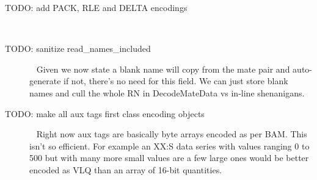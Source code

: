 \documentclass[a4paper]{article}
\begin{document}
\begin{description}
\item[TODO: add PACK, RLE and DELTA encodings]\ \newline

\item[TODO: sanitize read\_names\_included]\ \newline
  Given we now state a blank name will copy from the mate pair and
  auto-generate if not, there's no need for this field.  We can just
  store blank names and cull the whole RN in DecodeMateData vs in-line
  shenanigans.

\item[TODO: make all aux tags first class encoding objects]\ \newline
  Right now aux tags are basically byte arrays encoded as per BAM.
  This isn't so efficient.  For example an XX:S data series with
  values ranging 0 to 500 but with many more small values are a few
  large ones would be better encoded as VLQ than an array of 16-bit
  quantities.

\end{description}
\end{document}
